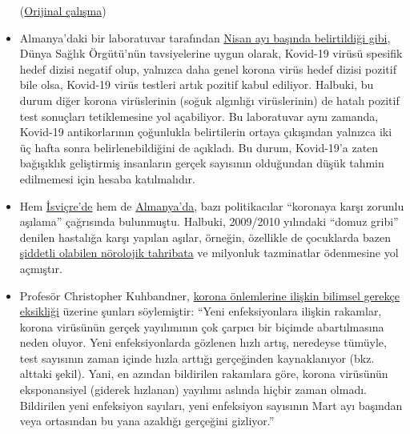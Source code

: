 \begin{itemize}
  (\href{https://www.who.int/influenza/publications/public_health_measures/publication/en/}{Orijinal
  çalışma})
\item
  Almanya'daki bir laboratuvar tarafından
  \href{http://www.labor-augsburg-mvz.de/de/aktuelles/coronavirus}{Nisan
  ayı başında belirtildiği gibi}, Dünya Sağlık Örgütü'nün tavsiyelerine
  uygun olarak, Kovid-19 virüsü spesifik hedef dizisi negatif olup,
  yalnızca daha genel korona virüs hedef dizisi pozitif bile olsa,
  Kovid-19 virüs testleri artık pozitif kabul ediliyor. Halbuki, bu
  durum diğer korona virüslerinin (soğuk algınlığı virüslerinin) de
  hatalı pozitif test sonuçları tetiklemesine yol açabiliyor. Bu
  laboratuvar aynı zamanda, Kovid-19 antikorlarının çoğunlukla
  belirtilerin ortaya çıkışından yalnızca iki üç hafta sonra
  belirlenebildiğini de açıkladı. Bu durum, Kovid-19'a zaten bağışıklık
  geliştirmiş insanların gerçek sayısının olduğundan düşük tahmin
  edilmemesi için hesaba katılmalıdır.
\item
  Hem
  \href{https://www.20min.ch/schweiz/news/story/-rzte-und-Politiker-fordern-Corona-Impfzwang-20853917}{İsviçre'de}
  hem de
  \href{https://www.faz.net/agenturmeldungen/dpa/soeder-waere-fuer-deutschlandweite-impfpflicht-gegen-corona-16738369.html}{Almanya'da},
  bazı politikacılar ``koronaya karşı zorunlu aşılama'' çağrısında
  bulunmuştu. Halbuki, 2009/2010 yılındaki ``domuz gribi'' denilen
  hastalığa karşı yapılan aşılar, örneğin, özellikle de çocuklarda bazen
  \href{https://www.ibtimes.co.uk/brain-damaged-uk-victims-swine-flu-vaccine-get-60-million-compensation-1438572}{şiddetli
  olabilen nörolojik tahribata} ve milyonluk tazminatlar ödenmesine yol
  açmıştır.
\item
  Profesör Christopher Kuhbandner,
  \href{https://www.heise.de/tp/features/Von-der-fehlenden-wissenschaftlichen-Begruendung-der-Corona-Massnahmen-4709563.html?seite=all}{korona
  önlemlerine ilişkin bilimsel gerekçe eksikliği} üzerine şunları
  söylemiştir: ``Yeni enfeksiyonlara ilişkin rakamlar, korona virüsünün
  gerçek yayılımının çok çarpıcı bir biçimde abartılmasına neden oluyor.
  Yeni enfeksiyonlarda gözlenen hızlı artış, neredeyse tümüyle, test
  sayısının zaman içinde hızla arttığı gerçeğinden kaynaklanıyor (bkz.
  alttaki şekil). Yani, en azından bildirilen rakamlara göre, korona
  virüsünün eksponansiyel (giderek hızlanan) yayılımı aslında hiçbir
  zaman olmadı. Bildirilen yeni enfeksiyon sayıları, yeni enfeksiyon
  sayısının Mart ayı başından veya ortasından bu yana azaldığı gerçeğini
  gizliyor.''
\end{itemize}


